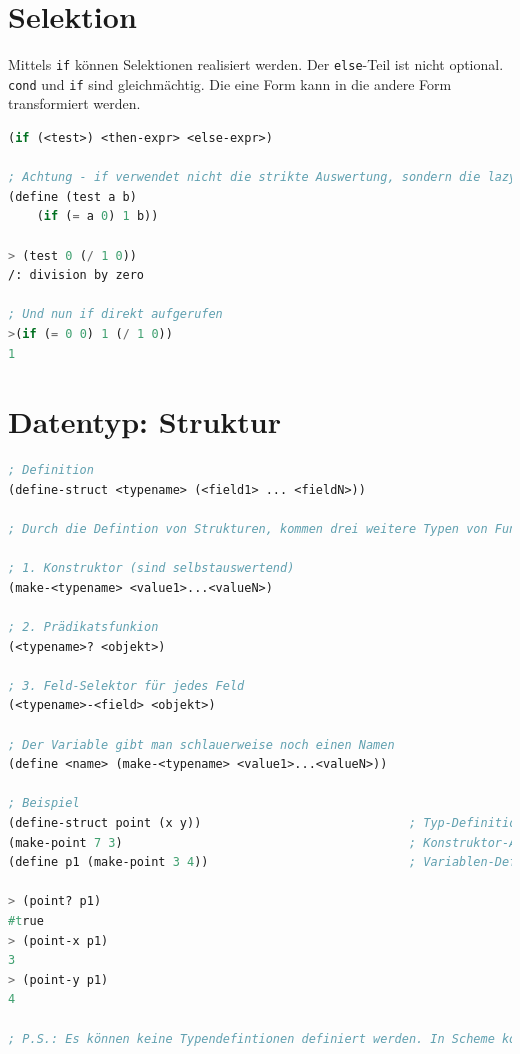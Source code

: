 \newpage
\section{Selektion}
Mittels \verb|if| können Selektionen realisiert werden. Der \verb|else|-Teil ist nicht optional. \verb|cond| und \verb|if| sind gleichmächtig. Die eine Form kann in die andere Form transformiert werden.

\begin{lstlisting}[language=Lisp, caption=Selektion]
(if (<test>) <then-expr> <else-expr>)

; Achtung - if verwendet nicht die strikte Auswertung, sondern die lazy evaluation.
(define (test a b)
	(if (= a 0) 1 b))
	
> (test 0 (/ 1 0))
/: division by zero	

; Und nun if direkt aufgerufen
>(if (= 0 0) 1 (/ 1 0))
1
\end{lstlisting}

\section{Datentyp: Struktur}

\begin{lstlisting}[language=Lisp, caption=Strukturen]
; Definition
(define-struct <typename> (<field1> ... <fieldN>))

; Durch die Defintion von Strukturen, kommen drei weitere Typen von Funktionen mit:

; 1. Konstruktor (sind selbstauswertend)
(make-<typename> <value1>...<valueN>)

; 2. Prädikatsfunkion
(<typename>? <objekt>)

; 3. Feld-Selektor für jedes Feld
(<typename>-<field> <objekt>)

; Der Variable gibt man schlauerweise noch einen Namen
(define <name> (make-<typename> <value1>...<valueN>))

; Beispiel
(define-struct point (x y)) 							; Typ-Definition
(make-point 7 3) 										; Konstruktor-Aufruf
(define p1 (make-point 3 4)) 							; Variablen-Definition

> (point? p1)
#true
> (point-x p1)
3
> (point-y p1)
4

; P.S.: Es können keine Typendefintionen definiert werden. In Scheme kommentiert man die Datentypen in den Strukturen. Scheme hat einen vordefinierte Struktur für den Punkt: posn (x y).
\end{lstlisting}

